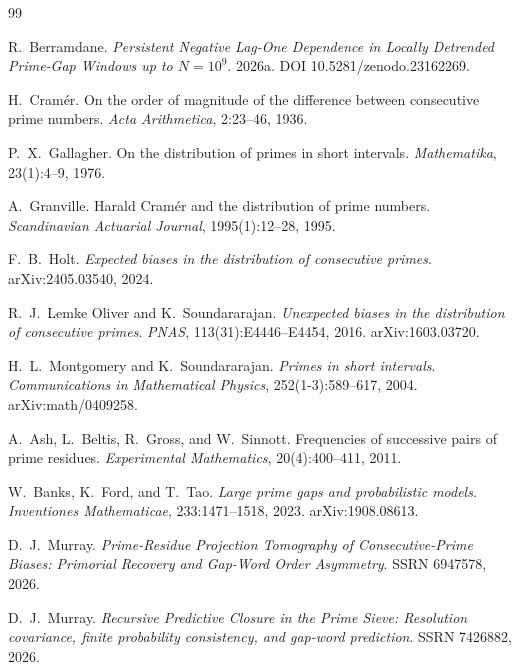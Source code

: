 \begin{thebibliography}{99}

R.~Berramdane.
\newblock \emph{Persistent Negative Lag-One Dependence in Locally Detrended Prime-Gap Windows up to $N=10^9$}.
\newblock 2026a. DOI 10.5281/zenodo.23162269.

H.~Cram\'er.
\newblock On the order of magnitude of the difference between consecutive prime numbers.
\newblock \emph{Acta Arithmetica}, 2:23--46, 1936.

P.~X.~Gallagher.
\newblock On the distribution of primes in short intervals.
\newblock \emph{Mathematika}, 23(1):4--9, 1976.

A.~Granville.
\newblock Harald Cram\'er and the distribution of prime numbers.
\newblock \emph{Scandinavian Actuarial Journal}, 1995(1):12--28, 1995.

F.~B.~Holt.
\newblock \emph{Expected biases in the distribution of consecutive primes}.
\newblock arXiv:2405.03540, 2024.

R.~J.~Lemke Oliver and K.~Soundararajan.
\newblock \emph{Unexpected biases in the distribution of consecutive primes}.
\newblock \emph{PNAS}, 113(31):E4446--E4454, 2016. arXiv:1603.03720.

H.~L.~Montgomery and K.~Soundararajan.
\newblock \emph{Primes in short intervals}.
\newblock \emph{Communications in Mathematical Physics}, 252(1-3):589--617, 2004.
\newblock arXiv:math/0409258.

A.~Ash, L.~Beltis, R.~Gross, and W.~Sinnott.
\newblock Frequencies of successive pairs of prime residues.
\newblock \emph{Experimental Mathematics}, 20(4):400--411, 2011.

W.~Banks, K.~Ford, and T.~Tao.
\newblock \emph{Large prime gaps and probabilistic models}.
\newblock \emph{Inventiones Mathematicae}, 233:1471--1518, 2023.
\newblock arXiv:1908.08613.

D.~J.~Murray.
\newblock \emph{Prime-Residue Projection Tomography of Consecutive-Prime Biases: Primorial Recovery and Gap-Word Order Asymmetry}.
\newblock SSRN 6947578, 2026.

D.~J.~Murray.
\newblock \emph{Recursive Predictive Closure in the Prime Sieve: Resolution covariance, finite probability consistency, and gap-word prediction}.
\newblock SSRN 7426882, 2026.

\end{thebibliography}
